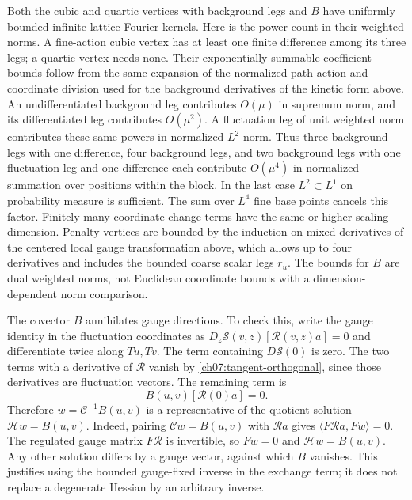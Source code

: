 Both the cubic and quartic vertices with background legs and $B$ have uniformly
bounded infinite-lattice Fourier kernels. Here is the power count in their
weighted norms. A fine-action cubic vertex has at least one
finite difference among its three legs; a quartic vertex needs none.
Their exponentially summable coefficient bounds follow from the same
expansion of the normalized path action and coordinate division used for the background
derivatives of the kinetic form above. An undifferentiated background leg contributes $O(\mu)$ in
supremum norm, and its differentiated leg contributes $O(\mu^2)$. A fluctuation
leg of unit weighted norm contributes these same powers in normalized $L^2$ norm.
Thus three background legs with one difference, four background legs,
and two background legs with one fluctuation leg and one difference each
contribute $O(\mu^4)$ in normalized summation over positions within the block. In the last case
$L^2\subset L^1$ on probability measure is sufficient. The sum over
$L^4$ fine base points cancels this factor. Finitely many coordinate-change
terms have the same or higher scaling dimension. Penalty vertices are bounded by
the induction on mixed derivatives of the centered local gauge transformation above, which allows up to
four derivatives and includes the bounded coarse scalar legs $r_u$.
The bounds for $B$ are dual weighted norms, not Euclidean coordinate
bounds with a dimension-dependent norm comparison.

The covector $B$ annihilates gauge directions. To check this, write the
gauge identity in the fluctuation coordinates as
$D_z\mathscr S(v,z)[\mathcal R(v,z)a]=0$ and differentiate twice along
$Tu,Tv$. The term containing $D\mathscr S(0)$ is zero. The two terms
with a derivative of $\mathcal R$ vanish by
\eqref{ch07:tangent-orthogonal}, since those derivatives are fluctuation
vectors. The remaining term is
\[
                       B(u,v)[\mathcal R(0)a]=0.
\]
Therefore $w=\mathscr C^{-1}B(u,v)$ is a representative of the quotient
solution $\mathscr H w=B(u,v)$. Indeed, pairing
$\mathscr Cw=B(u,v)$ with $\mathcal R a$ gives
$\langle F\mathcal R a,Fw\rangle=0$. The regulated gauge matrix
$F\mathcal R$ is invertible, so $Fw=0$ and $\mathscr H w=B(u,v)$.
Any other solution differs by a gauge vector, against which $B$ vanishes.
This justifies using the bounded gauge-fixed inverse in the exchange term;
it does not replace a degenerate Hessian by an arbitrary inverse.

